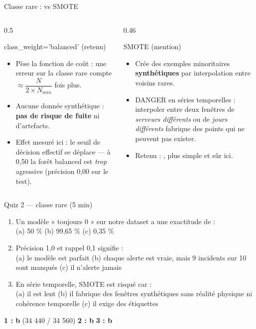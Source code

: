 \begin{frame}{Classe rare :  vs SMOTE}
\footnotesize%
\begin{columns}[t]
\begin{column}{0.5\textwidth}
\begin{block}{class\_weight='balanced' (retenu)}
\begin{itemize}
\item Pèse la fonction de coût : une erreur sur la classe rare
compte $\approx \dfrac{N}{2 \times N_{min}}$ fois plus.
\item Aucune donnée synthétique : \textbf{pas de risque de fuite}
ni d'artefacts.
\item Effet mesuré ici : le seuil de décision effectif se déplace
--- à 0,50 la forêt balanced est \emph{trop} agressive
(précision 0,00 sur le test).
\end{itemize}
\end{block}
\end{column}
\begin{column}{0.46\textwidth}
\begin{block}{SMOTE (mention)}
\begin{itemize}
\item Crée des exemples minoritaires \textbf{synthétiques} par
interpolation entre voisins rares.
\item DANGER en séries temporelles : interpoler entre deux
fenêtres de \emph{serveurs différents} ou de \emph{jours différents}
fabrique des points qui ne peuvent pas exister.
\item Retenu : , plus simple et sûr ici.
\end{itemize}
\end{block}
\end{column}
\end{columns}
\end{frame}

\begin{frame}{Quiz 2 --- classe rare (5 min)}
\begin{qbox}[3 questions]
\begin{enumerate}
\item Un modèle « toujours 0 » sur notre dataset a une exactitude de :\\
(a) 50 \% \quad (b) 99,65 \% \quad (c) 0,35 \%
\item Précision 1,0 et rappel 0,1 signifie :\\
(a) le modèle est parfait \quad (b) chaque alerte est vraie, mais
9 incidents sur 10 sont manqués \quad (c) il n'alerte jamais
\item En série temporelle, SMOTE est risqué car :\\
(a) il est lent \quad (b) il fabrique des fenêtres synthétiques
sans réalité physique ni cohérence temporelle \quad (c) il exige
des étiquettes
\end{enumerate}
\end{qbox}
\vspace{1mm}
\begin{solbox}[Réponses]
\textbf{1 : b} (34 440 / 34 560) \quad \textbf{2 : b} \quad \textbf{3 : b}
\end{solbox}
\end{frame}

